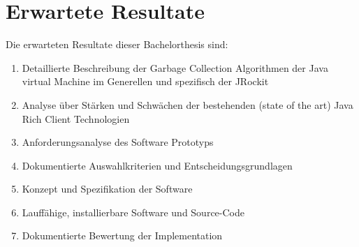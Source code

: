\section{Erwartete Resultate}
Die erwarteten Resultate dieser Bachelorthesis sind:
\begin{enumerate}
\item Detaillierte Beschreibung der Garbage Collection Algorithmen der Java virtual 
    Machine im Generellen und spezifisch der JRockit
\item Analyse über Stärken und Schwächen der bestehenden (state of the art) Java 
    Rich Client Technologien
\item Anforderungsanalyse des Software Prototyps
\item Dokumentierte Auswahlkriterien und Entscheidungsgrundlagen
\item Konzept und Spezifikation der Software
\item Lauffähige, installierbare Software und Source-Code
\item Dokumentierte Bewertung der Implementation
\end{enumerate}

